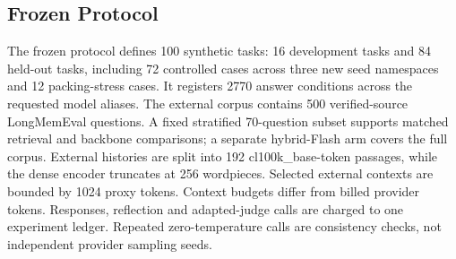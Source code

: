 \documentclass{article}
\begin{document}
\subsection{Frozen Protocol}
The frozen protocol defines 100 synthetic tasks: 16 development tasks and 84 held-out tasks, including 72 controlled cases across three new seed namespaces and 12 packing-stress cases. It registers 2770 answer conditions across the requested model aliases. The external corpus contains 500 verified-source LongMemEval questions. A fixed stratified 70-question subset supports matched retrieval and backbone comparisons; a separate hybrid-Flash arm covers the full corpus. External histories are split into 192 cl100k\_base-token passages, while the dense encoder truncates at 256 wordpieces. Selected external contexts are bounded by 1024 proxy tokens. Context budgets differ from billed provider tokens. Responses, reflection and adapted-judge calls are charged to one experiment ledger. Repeated zero-temperature calls are consistency checks, not independent provider sampling seeds.
\end{document}

